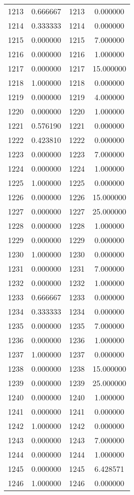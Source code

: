 \documentclass[12pt]{article}
\begin{document}
\begin{longtable}{@{}cccc@{}}
1213 & 0.666667 & 1213 & 0.000000 \\
1214 & 0.333333 & 1214 & 0.000000 \\
1215 & 0.000000 & 1215 & 7.000000 \\
1216 & 0.000000 & 1216 & 1.000000 \\
1217 & 0.000000 & 1217 & 15.000000 \\
1218 & 1.000000 & 1218 & 0.000000 \\
1219 & 0.000000 & 1219 & 4.000000 \\
1220 & 0.000000 & 1220 & 1.000000 \\
1221 & 0.576190 & 1221 & 0.000000 \\
1222 & 0.423810 & 1222 & 0.000000 \\
1223 & 0.000000 & 1223 & 7.000000 \\
1224 & 0.000000 & 1224 & 1.000000 \\
1225 & 1.000000 & 1225 & 0.000000 \\
1226 & 0.000000 & 1226 & 15.000000 \\
1227 & 0.000000 & 1227 & 25.000000 \\
1228 & 0.000000 & 1228 & 1.000000 \\
1229 & 0.000000 & 1229 & 0.000000 \\
1230 & 1.000000 & 1230 & 0.000000 \\
1231 & 0.000000 & 1231 & 7.000000 \\
1232 & 0.000000 & 1232 & 1.000000 \\
1233 & 0.666667 & 1233 & 0.000000 \\
1234 & 0.333333 & 1234 & 0.000000 \\
1235 & 0.000000 & 1235 & 7.000000 \\
1236 & 0.000000 & 1236 & 1.000000 \\
1237 & 1.000000 & 1237 & 0.000000 \\
1238 & 0.000000 & 1238 & 15.000000 \\
1239 & 0.000000 & 1239 & 25.000000 \\
1240 & 0.000000 & 1240 & 1.000000 \\
1241 & 0.000000 & 1241 & 0.000000 \\
1242 & 1.000000 & 1242 & 0.000000 \\
1243 & 0.000000 & 1243 & 7.000000 \\
1244 & 0.000000 & 1244 & 1.000000 \\
1245 & 0.000000 & 1245 & 6.428571 \\
1246 & 1.000000 & 1246 & 0.000000 \\

\end{longtable}
\end{document}
